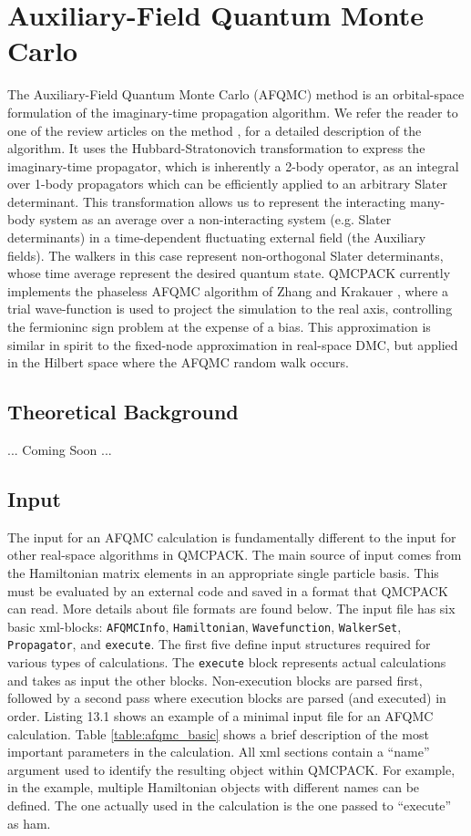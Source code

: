 \chapter{Auxiliary-Field Quantum Monte Carlo}
\label{chap:afqmc}
The Auxiliary-Field Quantum Monte Carlo (AFQMC) method is an orbital-space formulation of the imaginary-time propagation algorithm. We refer the reader to one of the review articles on the method \cite{AFQMC_review,PhysRevLett.90.136401,PhysRevE.70.056702}, for a detailed description of the algorithm. It uses the Hubbard-Stratonovich transformation to express the imaginary-time propagator, which is inherently a 2-body operator, as an integral over 1-body propagators which can be efficiently applied to an arbitrary Slater determinant. This transformation allows us to represent the interacting many-body system as an average over a non-interacting system (e.g. Slater determinants) in a time-dependent fluctuating external field (the Auxiliary fields). The walkers in this case represent non-orthogonal Slater determinants, whose time average represent the desired quantum state. QMCPACK currently implements the phaseless AFQMC algorithm of Zhang and Krakauer \cite{PhysRevLett.90.136401}, where a trial wave-function is used to project the simulation to the real axis, controlling the fermioninc sign problem at the expense of a bias. This approximation is similar in spirit to the fixed-node approximation in real-space DMC, but applied in the Hilbert space where the AFQMC random walk occurs.     

\section{Theoretical Background}
... Coming Soon ...

\section{Input}

The input for an AFQMC calculation is fundamentally different to the input for other real-space algorithms in QMCPACK. The main source of input comes from the Hamiltonian matrix elements in an appropriate single particle basis. This must be evaluated by an external code and saved in a format that QMCPACK can read. More details about file formats are found below. The input file has six basic xml-blocks: \texttt{AFQMCInfo}, \texttt{Hamiltonian}, \texttt{Wavefunction}, \texttt{WalkerSet}, \texttt{Propagator}, and \texttt{execute}. The first five define input structures required for various types of calculations. The \texttt{execute} block represents actual calculations and takes as input the other blocks. 
Non-execution blocks are parsed first, followed by a second pass where execution blocks are parsed (and executed) in order. Listing 13.1 shows an example of a minimal input file for an AFQMC calculation. Table \ref{table:afqmc_basic} shows a brief description of the most important parameters in the calculation. All xml sections contain a ``name'' argument used to identify the resulting object within QMCPACK. For example, in the example, multiple Hamiltonian objects with different names can be defined. The one actually used in the calculation is the one passed to ``execute'' as ham.

